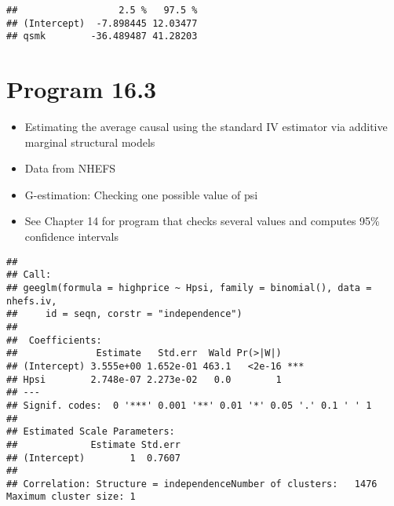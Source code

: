 \documentclass[
  10pt,
]{book}
\newenvironment{Shaded}{\begin{snugshade}}{\end{snugshade}}
\newcommand{\CommentTok}[1]{\textcolor[rgb]{0.56,0.35,0.01}{\textit{#1}}}
\newcommand{\DataTypeTok}[1]{\textcolor[rgb]{0.13,0.29,0.53}{#1}}
\newcommand{\DecValTok}[1]{\textcolor[rgb]{0.00,0.00,0.81}{#1}}
\newcommand{\FloatTok}[1]{\textcolor[rgb]{0.00,0.00,0.81}{#1}}
\newcommand{\KeywordTok}[1]{\textcolor[rgb]{0.13,0.29,0.53}{\textbf{#1}}}
\newcommand{\NormalTok}[1]{#1}
\newcommand{\OperatorTok}[1]{\textcolor[rgb]{0.81,0.36,0.00}{\textbf{#1}}}
\newcommand{\StringTok}[1]{\textcolor[rgb]{0.31,0.60,0.02}{#1}}
\providecommand{\tightlist}{%
  \setlength{\itemsep}{0pt}\setlength{\parskip}{0pt}}
\begin{document}
\begin{verbatim}
##                  2.5 %   97.5 %
## (Intercept)  -7.898445 12.03477
## qsmk        -36.489487 41.28203
\end{verbatim}

\hypertarget{program-16.3}{%
\section{Program 16.3}\label{program-16.3}}

\begin{itemize}
\tightlist
\item
  Estimating the average causal using the standard IV estimator via additive marginal structural models
\item
  Data from NHEFS
\item
  G-estimation: Checking one possible value of psi
\item
  See Chapter 14 for program that checks several values and computes 95\% confidence intervals
\end{itemize}

\begin{Shaded}
\end{Shaded}

\begin{verbatim}
## 
## Call:
## geeglm(formula = highprice ~ Hpsi, family = binomial(), data = nhefs.iv, 
##     id = seqn, corstr = "independence")
## 
##  Coefficients:
##              Estimate   Std.err  Wald Pr(>|W|)    
## (Intercept) 3.555e+00 1.652e-01 463.1   <2e-16 ***
## Hpsi        2.748e-07 2.273e-02   0.0        1    
## ---
## Signif. codes:  0 '***' 0.001 '**' 0.01 '*' 0.05 '.' 0.1 ' ' 1
## 
## Estimated Scale Parameters:
##             Estimate Std.err
## (Intercept)        1  0.7607
## 
## Correlation: Structure = independenceNumber of clusters:   1476   Maximum cluster size: 1
\end{verbatim}
\end{document}
